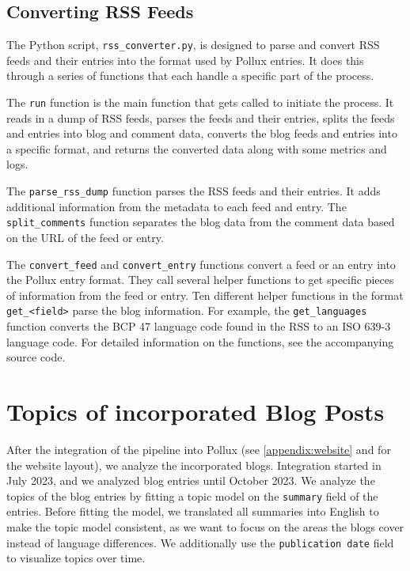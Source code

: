 \documentclass{article}
\begin{document}
\subsection{Converting RSS Feeds}

The Python script, \texttt{rss\_converter.py}, is designed to parse and convert RSS feeds and their entries into the format used by Pollux entries. It does this through a series of functions that each handle a specific part of the process.

The \texttt{run} function is the main function that gets called to initiate the process. It reads in a dump of RSS feeds, parses the feeds and their entries, splits the feeds and entries into blog and comment data, converts the blog feeds and entries into a specific format, and returns the converted data along with some metrics and logs.

The \texttt{parse\_rss\_dump} function parses the RSS feeds and their entries. It adds additional information from the metadata to each feed and entry.
The \texttt{split\_comments} function separates the blog data from the comment data based on the URL of the feed or entry.

The \texttt{convert\_feed} and \texttt{convert\_entry} functions convert a feed or an entry into the Pollux entry format. They call several helper functions to get specific pieces of information from the feed or entry.
Ten different helper functions in the format \texttt{get\_<field>} parse the blog information. For example, the \texttt{get\_languages} function converts the BCP 47 language code found in the RSS to an ISO 639-3 language code. For detailed information on the functions, see the accompanying source code.

\section{Topics of incorporated Blog Posts}\label{sec:Visualization}
After the integration of the pipeline into Pollux (see \autoref{appendix:website} and \citet{czolkoss-hettwerPolitikwissenschaftlicheBlogsSichtbar2023} for the website layout), we analyze the incorporated blogs. Integration started in July 2023, and we analyzed blog entries until October 2023. We analyze the topics of the blog entries by fitting a topic model on the \texttt{summary} field of the entries. Before fitting the model, we translated all summaries into English to make the topic model consistent, as we want to focus on the areas the blogs cover instead of language differences. We additionally use the \texttt{publication date} field to visualize topics over time.
\end{document}

